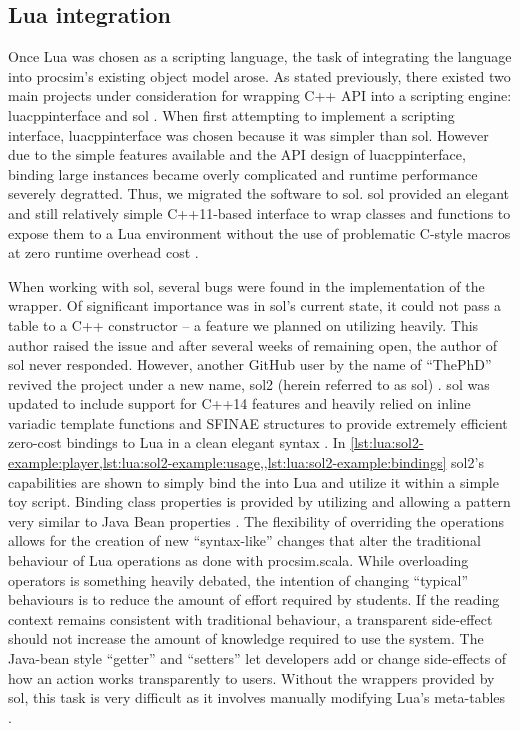 \subsection{Lua integration}

Once Lua was chosen as a scripting language, the task of integrating the language into procsim's existing object model arose. As stated previously, there existed two main projects under consideration for wrapping C++ API into a scripting engine: luacppinterface and sol \cite{GitHub:davidsiaw:luacppinterface, GitHub:Rapptz:Sol}. When first attempting to implement a scripting interface, luacppinterface was chosen because it was simpler than sol. However due to the simple features available and the API design of luacppinterface, binding large  instances became overly complicated and runtime performance severely degratted. Thus, we migrated the software to sol. sol provided an elegant and still relatively simple C++11-based interface to wrap classes and functions to expose them to a Lua environment without the use of problematic C-style macros at zero runtime overhead cost \cite{GitHub:Rapptz:Sol}.

When working with sol, several bugs were found in the implementation of the wrapper. Of significant importance was in sol's current state, it could not pass a table to a C++ constructor \cite{GitHub:Rapptz:Sol:74} -- a feature we planned on utilizing heavily. This author raised the issue and after several weeks of remaining open, the author of sol never responded. However, another GitHub user by the name of ``ThePhD'' revived the project under a new name, sol2 (herein referred to as sol) \cite{GitHub:ThePhD:sol2}. sol was updated to include support for C++14 features and heavily relied on inline variadic template functions and SFINAE structures \cite{cppreference:SFINAE} to provide extremely efficient zero-cost bindings to Lua in a clean elegant syntax \cite{GitHub:ThePhD:sol2:benchmarks, GitHub:ThePhD:sol2:cxx-in-lua}. In \cref{lst:lua:sol2-example:player,lst:lua:sol2-example:usage,,lst:lua:sol2-example:bindings} sol2's capabilities are shown to simply bind the  into Lua and utilize it within a simple toy script. Binding class properties is provided by utilizing  and  allowing a pattern very similar to Java Bean properties \cite{Oracle:JavaTutorial:JavaBeans}. The flexibility of overriding the operations allows for the creation of new ``syntax-like'' changes that alter the traditional behaviour of Lua operations as done with procsim.scala. While overloading operators is something heavily debated, the intention of changing ``typical'' behaviours is to reduce the amount of effort required by students. If the reading context remains consistent with traditional behaviour, a transparent side-effect should not increase the amount of knowledge required to use the system. The Java-bean style ``getter'' and ``setters'' let developers add or change side-effects of how an action works transparently to users. Without the wrappers provided by sol, this task is very difficult as it involves manually modifying Lua's meta-tables \cite{GitHub:ThePhD:sol2:usertype}.

